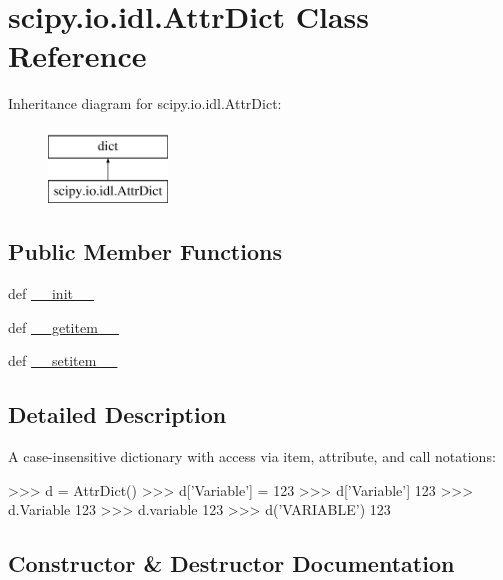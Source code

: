 \hypertarget{classscipy_1_1io_1_1idl_1_1AttrDict}{}\section{scipy.\+io.\+idl.\+Attr\+Dict Class Reference}
\label{classscipy_1_1io_1_1idl_1_1AttrDict}
Inheritance diagram for scipy.\+io.\+idl.\+Attr\+Dict\+:\begin{figure}[H]
\begin{center}
\leavevmode
\includegraphics[height=2.000000cm]{classscipy_1_1io_1_1idl_1_1AttrDict}
\end{center}
\end{figure}
\subsection*{Public Member Functions}
\begin{DoxyCompactItemize}
\item 
def \hyperlink{classscipy_1_1io_1_1idl_1_1AttrDict_a5129df5533d421bf3f759aee1cf79761}{\+\_\+\+\_\+init\+\_\+\+\_\+}
\item 
def \hyperlink{classscipy_1_1io_1_1idl_1_1AttrDict_a408ae442fea8cce2314459971170ef15}{\+\_\+\+\_\+getitem\+\_\+\+\_\+}
\item 
def \hyperlink{classscipy_1_1io_1_1idl_1_1AttrDict_a95631a2541dd75cb437434f3e4359a83}{\+\_\+\+\_\+setitem\+\_\+\+\_\+}
\end{DoxyCompactItemize}


\subsection{Detailed Description}
\begin{DoxyVerb}A case-insensitive dictionary with access via item, attribute, and call
notations:

    >>> d = AttrDict()
    >>> d['Variable'] = 123
    >>> d['Variable']
    123
    >>> d.Variable
    123
    >>> d.variable
    123
    >>> d('VARIABLE')
    123
\end{DoxyVerb}
 

\subsection{Constructor \& Destructor Documentation}
\hypertarget{classscipy_1_1io_1_1idl_1_1AttrDict_a5129df5533d421bf3f759aee1cf79761}{}
